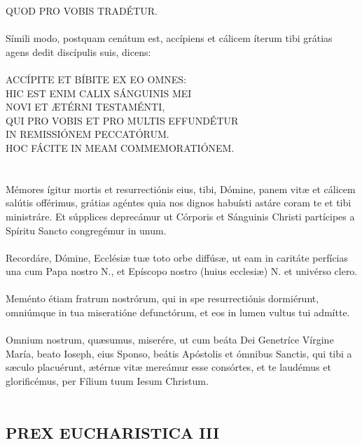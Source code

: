 \documentclass[12pt, a4paper]{article}
\begin{document}
	QUOD PRO VOBIS TRADÉTUR.
	\\\\
	Símili modo, postquam cenátum
	est, accípiens et cálicem íterum tibi
	grátias agens dedit discípulis suis,
	dicens:
	\\\\
	ACCÍPITE ET BÍBITE EX EO OMNES:
	\\
	HIC EST ENIM CALIX SÁNGUINIS MEI
	\\
	NOVI ET ÆTÉRNI TESTAMÉNTI,
	\\
	QUI PRO VOBIS ET PRO MULTIS EFFUNDÉTUR
	\\
	IN REMISSIÓNEM PECCATÓRUM.
	\\
	HOC FÁCITE IN MEAM COMMEMORATIÓNEM.
	\\\\
	\\
	Mémores ígitur mortis et
	resurrectiónis eius, tibi, Dómine,
	panem vitæ et cálicem salútis
	offérimus, grátias agéntes quia nos
	dignos habuísti astáre coram te et
	tibi ministráre. Et súpplices
	deprecámur ut Córporis et
	Sánguinis Christi partícipes a
	Spíritu Sancto congregémur in
	unum.
	\\\\
	Recordáre, Dómine, Ecclésiæ tuæ
	toto orbe diffúsæ, ut eam in caritáte
	perfícias una cum Papa nostro N.,
	et Epíscopo nostro (huius ecclesiæ)
	N. et univérso clero.
	\\\\
	Meménto étiam fratrum
	nostrórum, qui in spe resurrectiónis
	dormiérunt, omniúmque in tua
	miseratióne defunctórum, et eos in
	lumen vultus tui admítte.
	\\\\
	Omnium nostrum, quæsumus,
	miserére, ut cum beáta Dei
	Genetríce Vírgine María, beato
	Ioseph, eius Sponso, beátis
	Apóstolis et ómnibus Sanctis, qui
	tibi a sæculo placuérunt, ætérnæ
	vitæ mereámur esse consórtes, et te
	laudémus et glorificémus, per
	Fílium tuum Iesum Christum.
	\\\\
	
	\newpage
	
	\subsection*{PREX EUCHARISTICA III}
	
\end{document}

